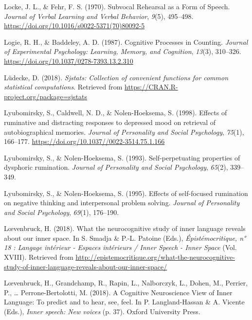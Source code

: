\documentclass[a4paper,12pt,twoside,openright,oldfontcommands]{memoir}
\begin{document}
\leavevmode\hypertarget{ref-locke_subvocal_1970}{}%
Locke, J. L., \& Fehr, F. S. (1970). Subvocal Rehearsal as a Form of Speech. \emph{Journal of Verbal Learning and Verbal Behavior}, \emph{9}(5), 495--498. \url{https://doi.org/10.1016/s0022-5371(70)80092-5}

\leavevmode\hypertarget{ref-logie_cognitive_1987}{}%
Logie, R. H., \& Baddeley, A. D. (1987). Cognitive Processes in Counting. \emph{Journal of Experimental Psychology: Learning, Memory, and Cognition}, \emph{13}(3), 310--326. \url{https://doi.org/10.1037/0278-7393.13.2.310}

\leavevmode\hypertarget{ref-R-sjstats}{}%
Lüdecke, D. (2018). \emph{Sjstats: Collection of convenient functions for common statistical computations}. Retrieved from \url{https://CRAN.R-project.org/package=sjstats}

\leavevmode\hypertarget{ref-Lyubomirsky1998}{}%
Lyubomirsky, S., Caldwell, N. D., \& Nolen-Hoeksema, S. (1998). Effects of ruminative and distracting responses to depressed mood on retrieval of autobiographical memories. \emph{Journal of Personality and Social Psychology}, \emph{75}(1), 166--177. \url{https://doi.org/10.1037//0022-3514.75.1.166}

\leavevmode\hypertarget{ref-lyubomirsky_self-perpetuating_1993}{}%
Lyubomirsky, S., \& Nolen-Hoeksema, S. (1993). Self-perpetuating properties of dysphoric rumination. \emph{Journal of Personality and Social Psychology}, \emph{65}(2), 339--349.

\leavevmode\hypertarget{ref-lyubomirsky_effects_1995}{}%
Lyubomirsky, S., \& Nolen-Hoeksema, S. (1995). Effects of self-focused rumination on negative thinking and interpersonal problem solving. \emph{Journal of Personality and Social Psychology}, \emph{69}(1), 176--190.

\leavevmode\hypertarget{ref-loevenbruck_what_2018}{}%
Lœvenbruck, H. (2018). What the neurocognitive study of inner language reveals about our inner space. In S. Smadja \& P.-L. Patoine (Eds.), \emph{Épistémocritique, n° 18 : Langage intérieur - Espaces intérieurs / Inner Speech - Inner Space} (Vol. XVIII). Retrieved from \url{http://epistemocritique.org/what-the-neurocognitive-study-of-inner-language-reveals-about-our-inner-space/}

\leavevmode\hypertarget{ref-loevenbruck_cognitive_2018}{}%
Lœvenbruck, H., Grandchamp, R., Rapin, L., Nalborczyk, L., Dohen, M., Perrier, P., \ldots{} Perrone-Bertolotti, M. (2018). A Cognitive Neuroscience View of Inner Language: To predict and to hear, see, feel. In P. Langland-Hassan \& A. Vicente (Eds.), \emph{Inner speech: New voices} (p. 37). Oxford University Press.
\end{document}
